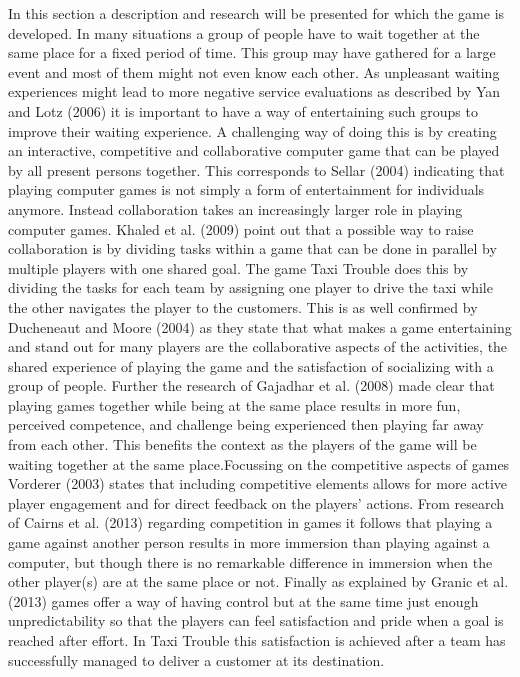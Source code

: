 In this section a description and research will be presented for which the game is developed. In many situations a group of people have to wait together at the same place for a fixed period of time. This group may have gathered for a large event and most of them might not even know each other. As unpleasant waiting experiences might lead to more negative service evaluations as described by Yan and Lotz (2006) it is important to have a way of entertaining such groups to improve their waiting experience. A challenging way of doing this is by creating an interactive, competitive and collaborative computer game that can be played by all present persons together. This corresponds to Sellar (2004) indicating that playing computer games is not simply a form of entertainment for individuals anymore. Instead collaboration takes an increasingly larger role in playing computer games. Khaled et al. (2009) point out that a possible way to raise collaboration is by dividing tasks within a game that can be done in parallel by multiple players with one shared goal. The game Taxi Trouble does this by dividing the tasks for each team by assigning one player to drive the taxi while the other navigates the player to the customers. This is as well confirmed by Ducheneaut and Moore (2004) as they state that what makes a game entertaining and stand out for many players are the collaborative aspects of the activities, the shared experience of playing the game and the satisfaction of socializing with a group of people. Further the research of Gajadhar et al. (2008) made clear that playing games together while being at the same place results in more fun, perceived competence, and challenge being experienced then playing far away from each other. This benefits the context as the players of the game will be waiting together at the same place.\qquad Focussing on the competitive aspects of games Vorderer (2003) states that including competitive elements allows for more active player engagement and for direct feedback on the players' actions. From research of Cairns et al. (2013) regarding competition in games it follows that playing a game against another person results in more immersion than playing against a computer, but though there is no remarkable difference in immersion when the other player(s) are at the same place or not. Finally as explained by Granic et al. (2013) games offer a way of having control but at the same time just enough unpredictability so that the players can feel satisfaction and pride when a goal is reached after effort. In Taxi Trouble this satisfaction is achieved after a team has successfully managed to deliver a customer at its destination.